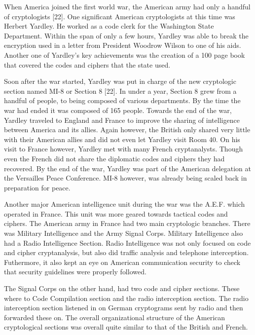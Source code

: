 \documentclass{article}
\begin{document}
    When America joined the first world war, the American army had only a handful of
    cryptologists [22].
    One significant American cryptologists at this time was Herbert Yardley.
    He worked as a code clerk for the Washington State Department.
    Within the span of only a few hours, Yardley was able to break the encryption
    used in a letter from President Woodrow Wilson to one of his aids.
    Another one of Yardley's key achievements was the creation of a 100 page book
    that covered the codes and ciphers that the state used.

    Soon after the war started, Yardley was put in charge of the new cryptologic section
    named MI-8 or Section 8 [22]. In under a year, Section 8 grew from a handful of people,
    to being composed of various departments. By the time the war had ended
    it was composed of 165 people.
    Towards the end of the war, Yardley traveled to England and France to improve
    the sharing of intelligence between America and its allies.
    Again however, the British only shared very little with their American allies and did
    not even let Yardley visit Room 40.
    On his visit to France however, Yardley met with many French cryptanalysts.
    Though even the French did not share the diplomatic codes and ciphers they had recovered.
    By the end of the war, Yardley was part of the American delegation at
    the Versailles Peace Conference. MI-8 however, was already being scaled back
    in preparation for peace.

    Another major American intelligence unit during the war was the A.E.F. which
    operated in France. This unit was more geared towards tactical codes and ciphers.
    The American army in France had two main cryptologic branches.
    There was Military Intelligence and the Army Signal Corps.
    Military Intelligence also had a Radio Intelligence Section. Radio Intelligence
    was not only focused on code and cipher cryptanalysis, but also did traffic
    analysis and telephone interception. Futhermore, it also kept an eye on American
    communication security to check that security guidelines were properly followed.

    The Signal Corps on the other hand, had two code and cipher sections. These
    where to Code Compilation section and the radio interception section.
    The radio interception section listened in on German cryptograms sent by radio
    and then forwarded these on.
    The overall organizational structure of the American cryptological sections
    was overall quite similar to that of the British and French.
\end{document}
